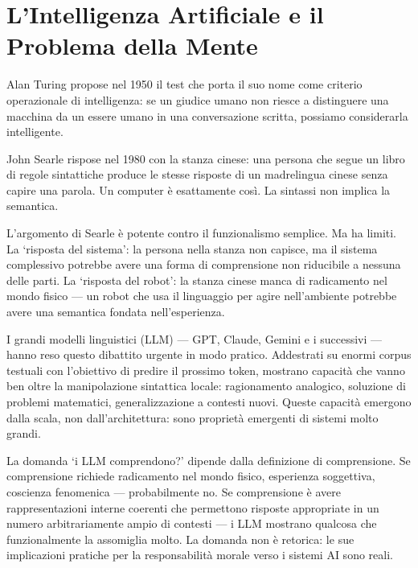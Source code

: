 \documentclass[12pt,a4paper,openany]{book}
\newcommand{\sezione}[1]{\vspace{1.2em}{\large\bfseries #1}\vspace{0.5em}\par}
\begin{document}
\chapter{L'Intelligenza Artificiale e il Problema della Mente}

\sezione{Turing e Searle}

Alan Turing propose nel 1950 il test che porta il suo nome come criterio operazionale di intelligenza: se un giudice umano non riesce a distinguere una macchina da un essere umano in una conversazione scritta, possiamo considerarla intelligente.

John Searle rispose nel 1980 con la stanza cinese: una persona che segue un libro di regole sintattiche produce le stesse risposte di un madrelingua cinese senza capire una parola. Un computer è esattamente così. La sintassi non implica la semantica.

L'argomento di Searle è potente contro il funzionalismo semplice. Ma ha limiti. La `risposta del sistema': la persona nella stanza non capisce, ma il sistema complessivo potrebbe avere una forma di comprensione non riducibile a nessuna delle parti. La `risposta del robot': la stanza cinese manca di radicamento nel mondo fisico — un robot che usa il linguaggio per agire nell'ambiente potrebbe avere una semantica fondata nell'esperienza.

\sezione{I grandi modelli linguistici}

I grandi modelli linguistici (LLM) — GPT, Claude, Gemini e i successivi — hanno reso questo dibattito urgente in modo pratico. Addestrati su enormi corpus testuali con l'obiettivo di predire il prossimo token, mostrano capacità che vanno ben oltre la manipolazione sintattica locale: ragionamento analogico, soluzione di problemi matematici, generalizzazione a contesti nuovi. Queste capacità emergono dalla scala, non dall'architettura: sono proprietà emergenti di sistemi molto grandi.

La domanda `i LLM comprendono?' dipende dalla definizione di comprensione. Se comprensione richiede radicamento nel mondo fisico, esperienza soggettiva, coscienza fenomenica — probabilmente no. Se comprensione è avere rappresentazioni interne coerenti che permettono risposte appropriate in un numero arbitrariamente ampio di contesti — i LLM mostrano qualcosa che funzionalmente la assomiglia molto. La domanda non è retorica: le sue implicazioni pratiche per la responsabilità morale verso i sistemi AI sono reali.
\end{document}
